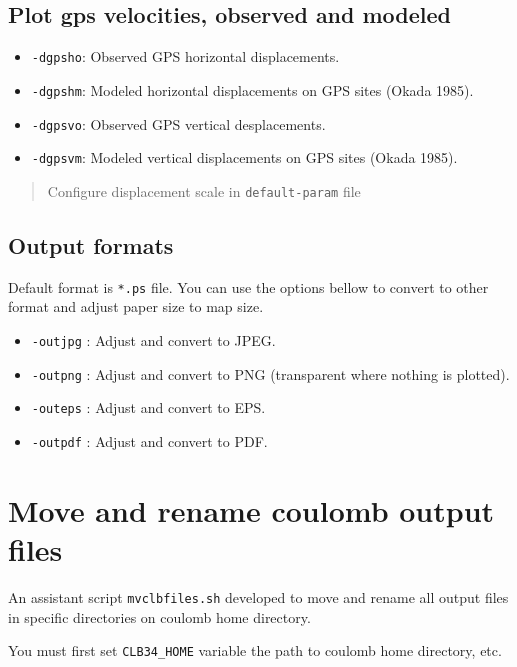 \subsection{Plot gps velocities, observed and
modeled}\label{plot-gps-velocities-observed-and-modeled}

\begin{itemize}
\item
  \texttt{-dgpsho}: Observed GPS horizontal displacements.
\item
  \texttt{-dgpshm}: Modeled horizontal displacements on GPS sites (Okada
  1985).
\item
  \texttt{-dgpsvo}: Observed GPS vertical desplacements.
\item
  \texttt{-dgpsvm}: Modeled vertical displacements on GPS sites (Okada
  1985).
\end{itemize}

\begin{quote}
Configure displacement scale in \texttt{default-param} file
\end{quote}

\subsection{Output formats}\label{output-formats}

Default format is \texttt{*.ps} file. You can use the options bellow to
convert to other format and adjust paper size to map size.

\begin{itemize}
\item
  \texttt{-outjpg} : Adjust and convert to JPEG.
\item
  \texttt{-outpng} : Adjust and convert to PNG (transparent where
  nothing is plotted).
\item
  \texttt{-outeps} : Adjust and convert to EPS.
\item
  \texttt{-outpdf} : Adjust and convert to PDF.
\end{itemize}

\section{Move and rename coulomb output
files}\label{move-and-rename-coulomb-output-files}

An assistant script \texttt{mvclbfiles.sh} developed to move and rename
all output files in specific directories on coulomb home directory.

You must first set \texttt{CLB34\_HOME} variable the path to coulomb
home directory, etc.

